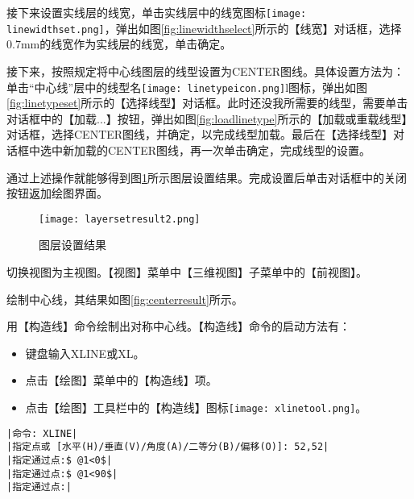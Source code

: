 \begin{procedure}
\begin{figure}[htbp]
\centering
\begin{floatrow}
\end{floatrow}
\end{figure}

接下来设置实线层的线宽，单击实线层中的线宽图标\texttt{[image: linewidthset.png]}，弹出如图\ref{fig:linewidthselect}所示的【线宽】对话框，选择0.7mm的线宽作为实线层的线宽，单击确定。

接下来，按照规定将中心线图层的线型设置为CENTER图线。具体设置方法为：单击“中心线”层中的线型名\texttt{[image: linetypeicon.png]}l图标，弹出如图\ref{fig:linetypeset}所示的【选择线型】对话框。此时还没我所需要的线型，需要单击对话框中的【加载...】按钮，弹出如图\ref{fig:loadlinetype}所示的【加载或重载线型】对话框，选择CENTER图线，并确定，以完成线型加载。最后在【选择线型】对话框中选中新加载的CENTER图线，再一次单击确定，完成线型的设置。
\begin{figure}[htbp]
\centering
\begin{floatrow}
\end{floatrow}
\end{figure}

通过上述操作就能够得到图\ref{fig:layersetresult2}所示图层设置结果。完成设置后单击对话框中的关闭按钮返加绘图界面。
\begin{figure}[htbp]
\centering
\texttt{[image: layersetresult2.png]}
\caption{图层设置结果}\label{fig:layersetresult2}
\end{figure}

\item 切换视图为主视图。【视图】菜单中【三维视图】子菜单中的【前视图】。
\item 绘制中心线，其结果如图\ref{fig:centerresult}所示。

用【构造线】命令绘制出对称中心线。【构造线】命令的启动方法有：
\begin{itemize}
\item 键盘输入XLINE或XL。
\item 点击【绘图】菜单中的【构造线】项。
\item 点击【绘图】工具栏中的【构造线】图标\texttt{[image: xlinetool.png]}。
\end{itemize}
\begin{lstlisting}
|命令: XLINE|
|指定点或 [水平(H)/垂直(V)/角度(A)/二等分(B)/偏移(O)]: 52,52|
|指定通过点:$ @1<0$|
|指定通过点:$ @1<90$|
|指定通过点:|
\end{lstlisting}


\end{procedure}
